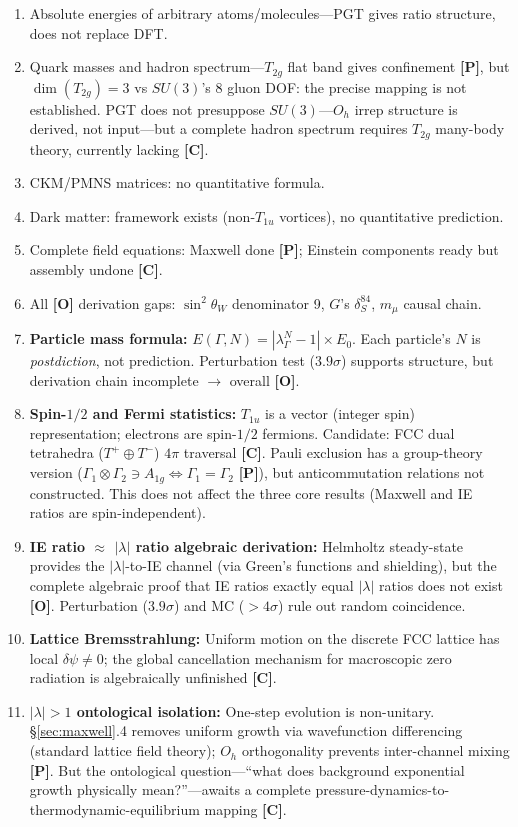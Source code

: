 \documentclass[11pt,a4paper]{article}
\newcommand{\gradeP}{\textbf{[P]}}
\newcommand{\gradeO}{\textbf{[O]}}
\newcommand{\gradeC}{\textbf{[C]}}
\begin{document}
\begin{enumerate}[nosep]
\item Absolute energies of arbitrary atoms/molecules---PGT gives ratio structure, does not replace DFT.
\item Quark masses and hadron spectrum---$T_{2g}$ flat band gives confinement \gradeP, but $\dim(T_{2g}){=}3$ vs $SU(3)$'s 8 gluon DOF: the precise mapping is not established. PGT does not presuppose $SU(3)$---$O_h$ irrep structure is derived, not input---but a complete hadron spectrum requires $T_{2g}$ many-body theory, currently lacking \gradeC.
\item CKM/PMNS matrices: no quantitative formula.
\item Dark matter: framework exists (non-$T_{1u}$ vortices), no quantitative prediction.
\item Complete field equations: Maxwell done \gradeP; Einstein components ready but assembly undone \gradeC.
\item All \gradeO{} derivation gaps: $\sin^2\theta_W$ denominator 9, $G$'s $\delta_S^{84}$, $m_\mu$ causal chain.
\item \textbf{Particle mass formula:} $E(\Gamma,N) = |\lambda_\Gamma^N - 1|\times E_0$. Each particle's $N$ is \emph{postdiction}, not prediction. Perturbation test ($3.9\sigma$) supports structure, but derivation chain incomplete $\to$ overall \gradeO.
\item \textbf{Spin-$1/2$ and Fermi statistics:} $T_{1u}$ is a vector (integer spin) representation; electrons are spin-$1/2$ fermions. Candidate: FCC dual tetrahedra ($T^+\oplus T^-$) $4\pi$ traversal \gradeC. Pauli exclusion has a group-theory version ($\Gamma_1\otimes\Gamma_2 \ni A_{1g} \Leftrightarrow \Gamma_1=\Gamma_2$ \gradeP), but anticommutation relations not constructed. This does not affect the three core results (Maxwell and IE ratios are spin-independent).
\item \textbf{IE ratio $\approx$ $|\lambda|$ ratio algebraic derivation:} Helmholtz steady-state provides the $|\lambda|$-to-IE channel (via Green's functions and shielding), but the complete algebraic proof that IE ratios exactly equal $|\lambda|$ ratios does not exist \gradeO. Perturbation ($3.9\sigma$) and MC ($>4\sigma$) rule out random coincidence.
\item \textbf{Lattice Bremsstrahlung:} Uniform motion on the discrete FCC lattice has local $\delta\psi\neq 0$; the global cancellation mechanism for macroscopic zero radiation is algebraically unfinished \gradeC.
\item \textbf{$|\lambda|>1$ ontological isolation:} One-step evolution is non-unitary. \S\ref{sec:maxwell}.4 removes uniform growth via wavefunction differencing (standard lattice field theory); $O_h$ orthogonality prevents inter-channel mixing \gradeP. But the ontological question---``what does background exponential growth physically mean?''---awaits a complete pressure-dynamics-to-thermodynamic-equilibrium mapping \gradeC.
\end{enumerate}
\end{document}
